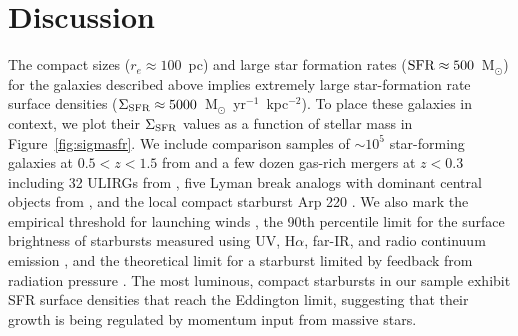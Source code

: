 \documentclass[apj]{emulateapj}
\newcommand{\msun}{M$_{\odot}$}
\newcommand{\units}{M$_{\odot}$~yr$^{-1}$~kpc$^{-2}$}
\newcommand{\sigmasfr}{\Sigma_{\textnormal{\scriptsize{SFR}}}}
\begin{document}
% 
% 
% 
% 
% 









\section{Discussion}

The compact sizes ($r_e\approx100$~pc) and large star formation rates
($\textnormal{SFR}\approx500$~\msun) for the galaxies described above
implies extremely large star-formation rate surface densities
($\sigmasfr\approx5000$~\units).  To place these galaxies in context,
we plot their $\sigmasfr$ values as a function of stellar mass in
Figure~\ref{fig:sigmasfr}.  We include comparison samples of
$\sim10^5$ star-forming galaxies at $0.5<z<1.5$ from \citet{wuy11} and
a few dozen gas-rich mergers at $z<0.3$ including 32 ULIRGs from
\citet{vei06}, five Lyman break analogs with dominant central objects
from \citet{ove09}, and the local compact starburst Arp 220
\citep{sco97, ken98, rod08}.  We also mark the empirical threshold for
launching winds \citep[$\sigmasfr\approx0.1$~\units,][]{hec02}, the
90th percentile limit for the surface brightness of starbursts
measured using UV, H$\alpha$, far-IR, and radio continuum emission
\citep[$\sigmasfr\approx45$~\units][]{meu97}, and the theoretical
limit for a starburst limited by feedback from radiation pressure
\citep[$\sigmasfr\approx2000$~\units,][]{mur05,tho05,hop10}.  The most
luminous, compact starbursts in our sample exhibit SFR surface
densities that reach the Eddington limit, suggesting that their growth
is being regulated by momentum input from massive stars.
\end{document}
